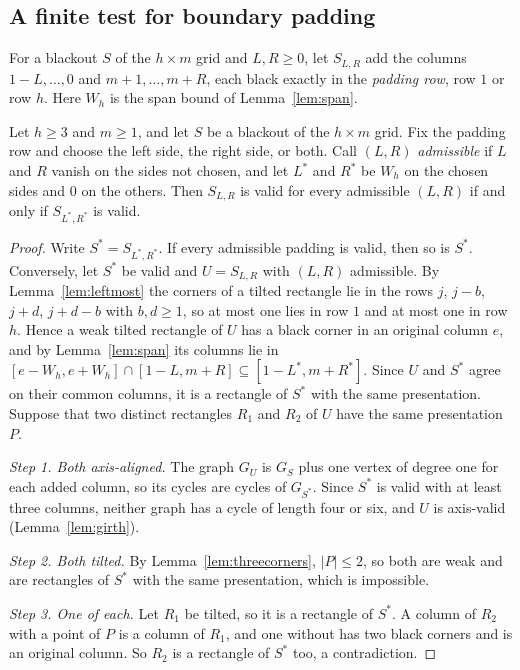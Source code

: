 \subsection{A finite test for boundary padding}

For a blackout $S$ of the $h\times m$ grid and $L,R\ge0$, let $S_{L,R}$ add the columns
$1-L,\dots,0$ and $m+1,\dots,m+R$, each black exactly in the \emph{padding row}, row $1$ or
row $h$. Here $W_h$ is the span bound of Lemma~\ref{lem:span}.

\begin{theorem}\label{thm:collar}
Let $h\ge3$ and $m\ge1$, and let $S$ be a blackout of the $h\times m$ grid. Fix the padding
row and choose the left side, the right side, or both. Call $(L,R)$ \emph{admissible} if
$L$ and $R$ vanish on the sides not chosen, and let $L^*$ and $R^*$ be $W_h$ on the chosen
sides and $0$ on the others. Then $S_{L,R}$ is valid for every admissible $(L,R)$ if and only if $S_{L^*,R^*}$ is
valid.
\end{theorem}

\begin{proof}
Write $S^*=S_{L^*,R^*}$. If every admissible padding is valid, then so is $S^*$.
Conversely, let $S^*$ be valid and
$U=S_{L,R}$ with $(L,R)$ admissible. By Lemma~\ref{lem:leftmost} the corners of a tilted
rectangle lie in the rows $j$, $j-b$, $j+d$, $j+d-b$ with $b,d\ge1$, so at most one lies in
row $1$ and at most one in row $h$. Hence a weak tilted rectangle of $U$ has a black corner in an
original column $e$, and by Lemma~\ref{lem:span} its columns lie in
$[e-W_h,e+W_h]\cap[1-L,m+R]\subseteq[1-L^*,m+R^*]$. Since $U$ and $S^*$ agree on their common
columns, it is a rectangle of $S^*$ with the same presentation. Suppose that two distinct
rectangles $R_1$ and $R_2$ of $U$ have the same presentation $P$.

\emph{Step 1. Both axis-aligned.} The graph $G_U$ is $G_S$ plus one vertex of degree one for
each added column, so its cycles are cycles of $G_{S^*}$. Since $S^*$ is valid with at least
three columns, neither graph has a cycle of length four or six, and $U$ is axis-valid
(Lemma~\ref{lem:girth}).

\emph{Step 2. Both tilted.} By Lemma~\ref{lem:threecorners}, $|P|\le2$, so both are weak and
are rectangles of $S^*$ with the same presentation, which is impossible.

\emph{Step 3. One of each.} Let $R_1$ be tilted, so it is a rectangle of $S^*$. A column of
$R_2$ with a point of $P$ is a column of $R_1$, and one without has two black corners and is
an original column. So $R_2$ is a rectangle of $S^*$ too, a contradiction.
\end{proof}

